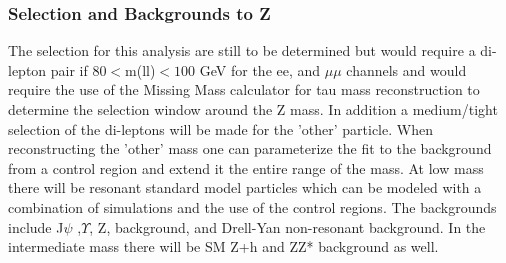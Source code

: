 \documentclass[11pt]{article}
\begin{document}

\subsubsection{Selection and Backgrounds to Z }
\label{sec:zscanback}
The selection for this analysis are still to be determined but would require a di-lepton pair if  $80<$m(ll)$<100$ GeV for the ee, and $\mu\mu$ channels and would require the use of the Missing Mass calculator for tau mass
reconstruction to determine the selection window around the Z mass.  In addition a medium/tight selection of the di-leptons will be made for the 'other' particle. 
When reconstructing the 'other' mass one can parameterize the fit to the background from a control region and extend it the entire range of the mass.  At low mass there will be resonant standard model particles which can be modeled with a combination of simulations and the use of the control regions.
The backgrounds include J$\psi$ ,$\Upsilon$, Z, \ttbar background, and Drell-Yan non-resonant background. In the intermediate mass there will be SM Z+h and ZZ* background as well.


\end{document}
